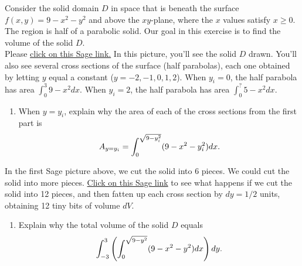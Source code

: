 \begin{problem}\label{prob:double-int half parabolic}%
Consider the solid domain $D$ in space that is beneath the surface $f(x,y)=9-x^2-y^2$ and above the $xy$-plane, where the $x$ values satisfy $x\geq 0$.  The region is half of a parabolic solid.  Our goal in this exercise is to find the volume of the solid $D$.\\

Please \href{http://bmw.byuimath.com/dokuwiki/doku.php?id=cross_sections_of_solid_by_letting_y_equal_a_constant}{click on this Sage link.} In this picture, you'll see the solid $D$ drawn.  You'll also see several cross sections of the surface (half parabolas), each one obtained by letting $y$ equal a constant ($y=-2, -1,0,1,2$). When $y_i=0$, the half parabola has area $\int_0^3 9-x^2dx$.  When $y_i=2$, the half parabola has area $\int_0^? 5-x^2dx$.
\begin{enumerate}
 \item  When $y=y_i$, explain why the area of each of the cross sections from the first part is $$A_{y=y_i}=\displaystyle \int_0^{\sqrt{9-y_i^2}} (9-x^2-y_i^2) dx.$$
\end{enumerate}
In the first Sage picture above, we cut the solid into 6 pieces. We could cut the solid into more pieces. \href{http://bmw.byuimath.com/dokuwiki/doku.php?id=cross_sections_multiplied_by_dy}{Click on this Sage link} to see what happens if we cut the solid into 12 pieces, and then fatten up each cross section by $dy=1/2$ units, obtaining 12 tiny bits of volume $dV$. 

\begin{enumerate}[resume]
	\item Explain why the total volume of the solid $D$ equals $$\displaystyle\int_{-3}^{3} \left(\int_0^{\sqrt{9-y^2}}(9-x^2-y^2) dx\right) dy.$$
\end{enumerate}
\end{problem}

